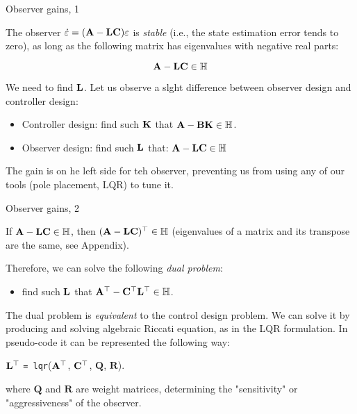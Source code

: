 \documentclass{beamer}
\begin{document}
\begin{frame}{Observer gains, 1}
\begin{flushleft}

The observer $\dot {\varepsilon}= 
(\mathbf{A} - \mathbf{L} \mathbf{C}) \varepsilon$ is \emph{stable} (i.e., the state estimation error tends to zero), as long as the following matrix has eigenvalues with negative real parts:

\[
\mathbf{A} - 
\mathbf{L} \mathbf{C} \in \mathbb{H}
\]

We need to find $\mathbf{L}$. Let us observe a slght difference between observer design and controller design:

\bigskip

\begin{itemize}
    \item Controller design: find such $\mathbf{K}$ that $\mathbf{A} - \mathbf{B} \mathbf{K} \in \mathbb{H}$.
    \item Observer design: find such $\mathbf{L}$ that: $\mathbf{A} - \mathbf{L} \mathbf{C} \in \mathbb{H}$
\end{itemize}

\bigskip

The gain is on he left side for teh observer, preventing us from using any of our tools (pole placement, LQR) to tune it.

\end{flushleft}
\end{frame}


\begin{frame}{Observer gains, 2}
\begin{flushleft}

If $\mathbf{A} - \mathbf{L} \mathbf{C}\in \mathbb{H}$, then $(\mathbf{A} - 
\mathbf{L} \mathbf{C})^{\top}\in \mathbb{H}$ (eigenvalues of a matrix and its transpose are the same, see Appendix). 

\bigskip

Therefore, we can solve the following \emph{dual problem}:

\begin{itemize}
    \item find such $\mathbf{L}$ that $\mathbf{A}^{\top} - 
\mathbf{C}^{\top} \mathbf{L}^{\top} \in \mathbb{H}$.
\end{itemize}

\bigskip

The dual problem is \emph{equivalent} to the control design problem. We can solve it by producing and solving algebraic Riccati equation, as in the LQR formulation. In pseudo-code it can be represented the following way:

\bigskip

$\mathbf{L}^{\top}$ \texttt{= lqr}($\mathbf{A}^{\top}$, $\mathbf{C}^{\top}$, $\mathbf Q$, $\mathbf R$).

where $\mathbf Q$ and $\mathbf R$ are weight  matrices, determining the "sensitivity" or "aggressiveness" of the observer.


\end{flushleft}
\end{frame}
\end{document}

